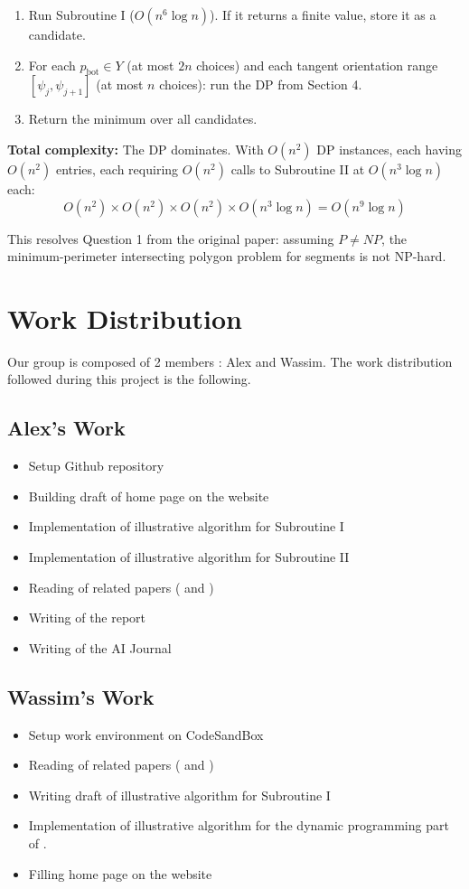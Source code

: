 \documentclass{article}
\begin{document}
\begin{enumerate}
\item Run Subroutine I ($O(n^6 \log n)$). If it returns a finite value,
      store it as a candidate.
\item For each $p_{\text{bot}} \in Y$ (at most $2n$ choices) and each tangent
      orientation range $[\psi_j, \psi_{j+1}]$ (at most $n$ choices):
      run the DP from Section 4.
\item Return the minimum over all candidates.
\end{enumerate}

\textbf{Total complexity:} The DP dominates. With $O(n^2)$ DP instances, each
having $O(n^2)$ entries, each requiring $O(n^2)$ calls to Subroutine II at
$O(n^3 \log n)$ each:
\[
O(n^2) \times O(n^2) \times O(n^2) \times O(n^3 \log n) = O(n^9 \log n)
\]

This resolves Question 1 from the original paper: assuming $P \neq NP$, the
minimum-perimeter intersecting polygon problem for segments is not
NP-hard.

\section{Work Distribution}
Our group is composed of 2 members : Alex and Wassim. The work distribution followed during this project is the following. 
\subsection{Alex's Work}
\begin{itemize}
    \item Setup Github repository 
    \item Building draft of home page on the website
    \item Implementation of illustrative algorithm for Subroutine I
    \item Implementation of illustrative algorithm for Subroutine II
    \item Reading of related papers (\cite{10.1007/3-540-57568-5_235} and \cite{10.1145/780542.780612})
    \item Writing of the report
    \item Writing of the AI Journal
\end{itemize}

\subsection{Wassim's Work}
\begin{itemize}
    \item Setup work environment on CodeSandBox
    \item Reading of related papers (\cite{Antoniadis_deBerg_Kisfaludi-Bak_Skarlatos_2025} and \cite{10.1007/3-540-57568-5_235})
    \item Writing draft of illustrative algorithm for Subroutine I
    \item Implementation of illustrative algorithm for the dynamic programming part of \cite{Antoniadis_deBerg_Kisfaludi-Bak_Skarlatos_2025}. 
    \item Filling home page on the website
\end{itemize}

\newpage
\printbibliography
\end{document}
